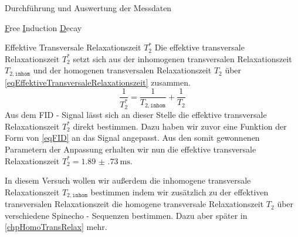 \documentclass[pdftex, a4paper,11pt, twoside, ngerman]{report}
\begin{document}
\begin{chapter}{Durchführung und Auswertung der Messdaten}
\begin{section}{
        \underline{F}ree \underline{I}nduction \underline{D}ecay}

      
      \begin{subsection}
        {Effektive Transversale Relaxationszeit $T_{2}^{*}$}
        \label{chpEffTransRelax}
        Die effektive transversale Relaxationszeit $T_{2}^{*}$ setzt sich
        aus der inhomogenen transversalen Relaxationszeit
        $T_{2,\mathtt{inhom}}$ und der homogenen transversalen Relaxationszeit
        $T_{2}$ über \cref{eqEffektiveTransversaleRelaxationszeit} zusammen.
        \begin{equation}
          \label{eqEffektiveTransversaleRelaxationszeit}
          \frac{1}{T_{2}^{*}}=\frac{1}{T_{2,\mathtt{inhom}}}+\frac{1}{T_{2}}
        \end{equation}
        Aus dem FID - Signal lässt sich an dieser Stelle die effektive
        transversale Relaxationszeit $T_{2}^{*}$ direkt bestimmen.
        Dazu haben wir zuvor eine Funktion der Form von \cref{eqFID} an das
        Signal angepasst.
        Aus den somit gewonnenen Parametern der Anpassung erhalten wir nun
        die effektive transversale Relaxationszeit
        $T_{2}^{*}=\SI{1.89(73)}{\milli\second}$.
        
        In diesem Versuch wollen wir außerdem die inhomogene transversale
        Relaxationszeit $T_{2,\mathtt{inhom}}$ bestimmen indem wir zusätzlich
        zu der effektiven transversalen Relaxationszeit die homogene
        transversale Relaxationszeit $T_{2}$ über verschiedene
        Spinecho - Sequenzen bestimmen.
        Dazu aber später in \cref{chpHomoTransRelax} mehr.
        
      \end{subsection}
      
    \end{section}
    
    
    

\end{chapter}
\end{document}
